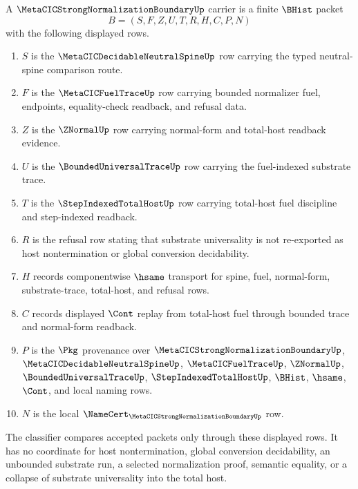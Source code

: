 \begin{definition}
\label{def:metacic-sn-boundary-carrier}
A $\MetaCICStrongNormalizationBoundaryUp$ carrier is a finite $\BHist$ packet
$$
B=(S,F,Z,U,T,R,H,C,P,N)
$$
with the following displayed rows.
\begin{enumerate}
  \item $S$ is the $\MetaCICDecidableNeutralSpineUp$ row carrying the typed neutral-spine comparison route.
  \item $F$ is the $\MetaCICFuelTraceUp$ row carrying bounded normalizer fuel, endpoints, equality-check readback, and refusal data.
  \item $Z$ is the $\ZNormalUp$ row carrying normal-form and total-host readback evidence.
  \item $U$ is the $\BoundedUniversalTraceUp$ row carrying the fuel-indexed substrate trace.
  \item $T$ is the $\StepIndexedTotalHostUp$ row carrying total-host fuel discipline and step-indexed readback.
  \item $R$ is the refusal row stating that substrate universality is not re-exported as host nontermination or global conversion decidability.
  \item $H$ records componentwise $\hsame$ transport for spine, fuel, normal-form, substrate-trace, total-host, and refusal rows.
  \item $C$ records displayed $\Cont$ replay from total-host fuel through bounded trace and normal-form readback.
  \item $P$ is the $\Pkg$ provenance over $\MetaCICStrongNormalizationBoundaryUp$, $\MetaCICDecidableNeutralSpineUp$, $\MetaCICFuelTraceUp$, $\ZNormalUp$, $\BoundedUniversalTraceUp$, $\StepIndexedTotalHostUp$, $\BHist$, $\hsame$, $\Cont$, and local naming rows.
  \item $N$ is the local $\NameCert_{\MetaCICStrongNormalizationBoundaryUp}$ row.
\end{enumerate}
The classifier compares accepted packets only through these displayed rows. It has no coordinate for host nontermination, global conversion decidability, an unbounded substrate run, a selected normalization proof, semantic equality, or a collapse of substrate universality into the total host.
\end{definition}

